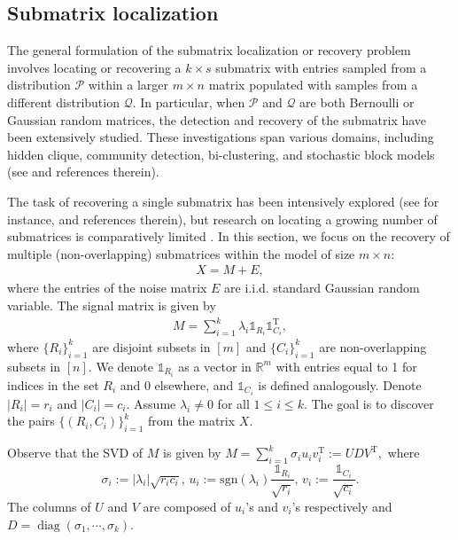 \documentclass[reqno]{amsart}
\DeclareMathOperator{\diag}{diag}
\newcommand{\T}{\mathrm{T}}
\theoremstyle{plain}
\theoremstyle{definition}
\begin{document}
\subsection{Submatrix localization}\label{sec:submatrix} The general formulation of the submatrix localization or recovery problem involves locating or recovering a $k \times s$ submatrix with entries sampled from a distribution $\mathcal{P}$ within a larger $m \times n$ matrix populated with samples from a different distribution $\mathcal{Q}$.  In particular, when $\mathcal P$ and $\mathcal Q$ are both Bernoulli or Gaussian random matrices, the detection and recovery of the submatrix have been extensively studied. These investigations span various domains, including hidden clique, community detection, bi-clustering, and stochastic block models (see \cite{AKS98, FR10, Mc01, BKRSW11, BI13, BIS15,ACV14, DGGR14, KBR11, MRZ15, MW15,CX16, CLR17, HWX16, BBH18, Vu18, BV23, DHB23} and references therein).   

The task of recovering a single submatrix has been intensively explored (see for instance, \cite{CLR17,HWX16,BIS15,CX16,Vu18,Mc01} and references therein), but research on locating a growing number of submatrices is comparatively limited \cite{CX16, CLR17, DHB23}. In this section, we focus on the recovery of multiple (non-overlapping) submatrices within the model of size $m\times n$: 
\begin{align}\label{def:sub}
X=M + E,
\end{align}
where the entries of the noise matrix $E$ are i.i.d. standard Gaussian random variable. The signal matrix is given by
\begin{align*}
M=\sum_{i=1}^k \lambda_i \mathds{1}_{R_i} \mathds{1}_{C_i}^\T , 
\end{align*}
where $\{ R_i\}_{i=1}^k$ are disjoint subsets in $[m]$ and $\{ C_i\}_{i=1}^k$ are non-overlapping subsets in $[n]$. We denote $\mathds{1}_{R_i}$ as a vector in $\mathbb R^m$ with entries equal to 1 for indices in the set $R_i$ and 0 elsewhere, and $\mathds{1}_{C_i}$ is defined analogously.  Denote $|R_i| =r_i$ and $|C_i| = c_i$. Assume $\lambda_i\neq 0$ for all $1\le i \le k$. The goal is to discover the pairs $\{ (R_i, C_i) \}_{i=1}^k$ from the matrix $X$. 

Observe 
that the SVD of $M$ is given by 
$M= \sum_{i=1}^k \sigma_ i u_i v_i^\T:=U D V^\T,$ where $$\sigma_i := |\lambda_i | \sqrt{r_i c_i}, \, u_i := \mathrm{sgn}(\lambda_i) \frac{\mathds{1}_{R_i}}{\sqrt{r_i}},\, v_i:=\frac{\mathds{1}_{C_i}}{\sqrt{c_i}}.$$The columns of $U$ and $V$ are composed of $u_i$'s and $v_i$'s respectively and $D=\diag(\sigma_1,\cdots,\sigma_k)$. 
\end{document}
